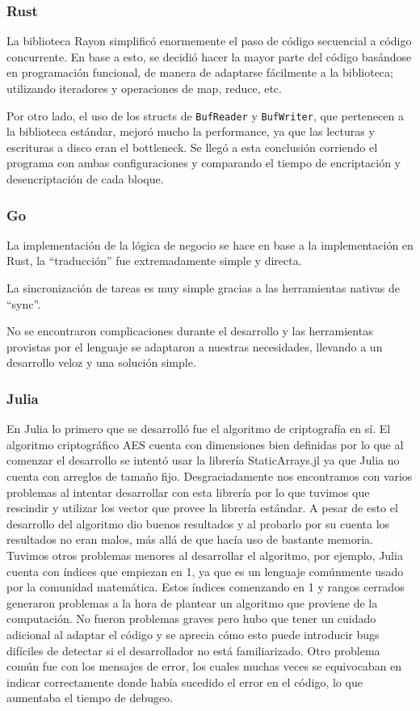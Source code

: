 \documentclass[11pt]{article}
\let\Oldsubsubsection\subsubsection
\renewcommand{\subsubsection}{\FloatBarrier\Oldsubsubsection}
\begin{document}
\subsubsection{Rust}

La biblioteca Rayon simplificó enormemente el paso de código secuencial a código concurrente. En base a esto, se decidió hacer la mayor parte del código basándose en programación funcional, de manera de adaptarse fácilmente a la biblioteca; utilizando iteradores y operaciones de map, reduce, etc.

Por otro lado, el uso de los structs de \texttt{BufReader} y \texttt{BufWriter}, que pertenecen a la biblioteca estándar, mejoró mucho la performance, ya que las lecturas y escrituras a disco eran el bottleneck. Se llegó a esta conclusión corriendo el programa con ambas configuraciones y comparando el tiempo de encriptación y desencriptación de cada bloque.

\subsubsection{Go}

La implementación de la lógica de negocio se hace en base a la implementación en Rust, la “traducción” fue extremadamente simple y directa.

La sincronización de tareas es muy simple gracias a las herramientas nativas de “sync”.

No se encontraron complicaciones durante el desarrollo y las herramientas provistas por el lenguaje se adaptaron a nuestras necesidades, llevando a un desarrollo veloz y una solución simple.

\subsubsection{Julia}

En Julia lo primero que se desarrolló fue el algoritmo de criptografía en sí. El algoritmo criptográfico AES cuenta con dimensiones bien definidas por lo que al comenzar el desarrollo se intentó usar la librería StaticArrays.jl ya que Julia no cuenta con arreglos de tamaño fijo. Desgraciadamente nos encontramos con varios problemas al intentar desarrollar con esta librería por lo que tuvimos que rescindir y utilizar los vector que provee la librería estándar. A pesar de esto el desarrollo del algoritmo dio buenos resultados y al probarlo por su cuenta los resultados no eran malos, más allá de que hacía uso de bastante memoria. Tuvimos otros problemas menores al desarrollar el algoritmo, por ejemplo, Julia cuenta con índices que empiezan en 1, ya que es un lenguaje comúnmente usado por la comunidad matemática. Estos índices comenzando en 1 y rangos cerrados generaron problemas a la hora de plantear un algoritmo que proviene de la computación. No fueron problemas graves pero hubo que tener un cuidado adicional al adaptar el código y se aprecia cómo esto puede introducir bugs difíciles de detectar si el desarrollador no está familiarizado. Otro problema común fue con los mensajes de error, los cuales muchas veces se equivocaban en indicar correctamente donde había sucedido el error en el código, lo que aumentaba el tiempo de debugeo.
\end{document}
